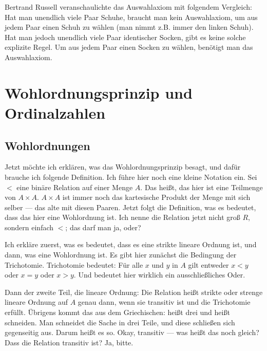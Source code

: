 \begin{didactic-insight}
Bertrand Russell veranschaulichte das Auswahlaxiom mit folgendem Vergleich:
Hat man unendlich viele Paar Schuhe, braucht man kein Auswahlaxiom, um aus jedem Paar einen Schuh zu wählen (man nimmt z.B. immer den linken Schuh). Hat man jedoch unendlich viele Paar identischer Socken, gibt es keine solche explizite Regel. Um aus jedem Paar einen Socken zu wählen, benötigt man das Auswahlaxiom.
\end{didactic-insight}

\section{Wohlordnungsprinzip und Ordinalzahlen}

\subsection{Wohlordnungen}

\begin{spoken-clean}[00:22:30 - 00:25:00]
Jetzt möchte ich erklären, was das Wohlordnungsprinzip besagt, und dafür brauche ich folgende Definition. Ich führe hier noch eine kleine Notation ein. Sei $<$ eine binäre Relation auf einer Menge $A$. Das heißt, das hier ist eine Teilmenge von $A \times A$. $A \times A$ ist immer noch das kartesische Produkt der Menge mit sich selber --- das alte mit diesen Paaren. Jetzt folgt die Definition, was es bedeutet, dass das hier eine Wohlordnung ist. Ich nenne die Relation jetzt nicht groß $R$, sondern einfach $<$; das darf man ja, oder?

Ich erkläre zuerst, was es bedeutet, dass es eine strikte lineare Ordnung ist, und dann, was eine Wohlordnung ist. Es gibt hier zunächst die Bedingung der Trichotomie. Trichotomie bedeutet: Für alle $x$ und $y$ in $A$ gilt entweder $x < y$ oder $x = y$ oder $x > y$. Und  bedeutet hier wirklich ein ausschließliches Oder. 

Dann der zweite Teil, die lineare Ordnung: Die Relation heißt strikte oder strenge lineare Ordnung auf $A$ genau dann, wenn sie transitiv ist und die Trichotomie erfüllt. Übrigens kommt das aus dem Griechischen:  heißt drei und  heißt schneiden. Man schneidet die Sache in drei Teile, und diese schließen sich gegenseitig aus. Darum heißt es so. Okay, transitiv --- was heißt das noch gleich? Dass die Relation transitiv ist? Ja, bitte.
\end{spoken-clean}

